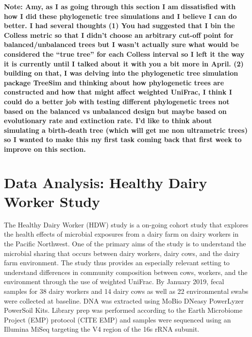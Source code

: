 \documentclass{article}
\begin{document}
\textbf{Note: Amy, as I as going through this section I am dissatisfied with how I did these phylogenetic tree simulations and I believe I can do better. I had several thoughts (1) You had suggested that I bin the Colless metric so that I didn't choose an arbitrary cut-off point for balanced/unbalanced trees but I wasn't actually sure what would be considered the ``true tree'' for each Colless interval so I left it the way it is currently until I talked about it with you a bit more in April. (2) building on that, I was delving into the phylogenetic tree simulation package TreeSim and thinking about how phylogenetic trees are constructed and how that might affect weighted UniFrac, I think I could do a better job with testing different phylogenetic trees not based on the balanced vs unbalanced design but maybe based on evolutionary rate and extinction rate. I'd like to think about simulating a birth-death tree (which will get me non ultrametric trees) so I wanted to make this my first task coming back that first week to improve on this section.}

\section{Data Analysis: Healthy Dairy Worker Study}
The Healthy Dairy Worker (HDW) study is a on-going cohort study that explores the health effects of microbial exposures from a dairy farm on dairy workers in the Pacific Northwest. One of the primary aims of the study is to understand the microbial sharing that occurs between dairy workers, dairy cows, and the dairy farm environment. The study thus provides an especially relevant setting to understand differences in community composition between cows, workers, and the environment through the use of weighted UniFrac. By January 2019, fecal samples for 38 dairy workers and 14 dairy cows as well as 22 environmental swabs were collected at baseline. DNA was extracted using MoBio DNeasy PowerLyzer PowerSoil Kits. Library prep was performed according to the Earth Microbiome Project (EMP) protocol (CITE EMP) and samples were sequenced using an Illumina MiSeq targeting the V4 region of the 16s rRNA subunit.
\end{document}
